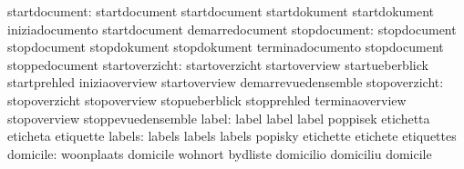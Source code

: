                    startdocument: startdocument                    startdocument
                                  startdokument                    startdokument
                                  iniziadocumento                  startdocument
                                  demarredocument
                    stopdocument: stopdocument                     stopdocument
                                  stopdokument                     stopdokument
                                  terminadocumento                 stopdocument
                                  stoppedocument
                  startoverzicht: startoverzicht                   startoverview
                                  startueberblick                  startprehled
                                  iniziaoverview                   startoverview
                                  demarrevuedensemble
                   stopoverzicht: stopoverzicht                    stopoverview
                                  stopueberblick                   stopprehled
                                  terminaoverview                  stopoverview
                                  stoppevuedensemble
                           label: label                            label
                                  label                            poppisek
                                  etichetta                        eticheta
                                  etiquette
                          labels: labels                           labels
                                  labels                           popisky
                                  etichette                        etichete
                                  etiquettes
                        domicile: woonplaats                       domicile
                                  wohnort                          bydliste
                                  domicilio                        domiciliu
                                  domicile

\stopcommands


\stoplogginginterface

\endinput
